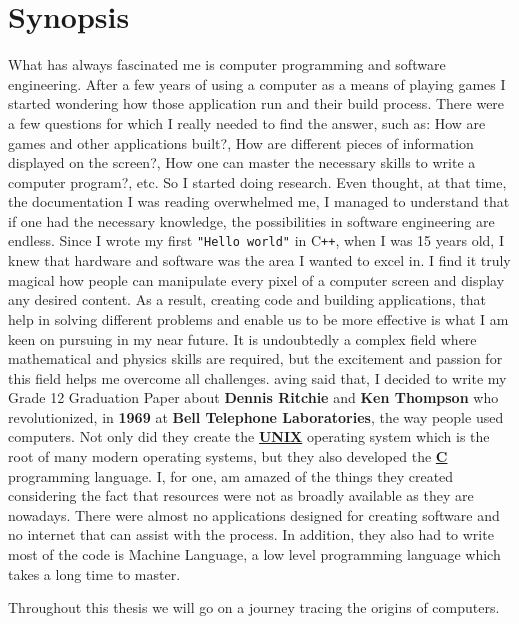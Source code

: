 \documentclass[12pt]{article}
\begin{document}
\section{Synopsis}
What has always fascinated me is computer programming and software engineering.
After a few years of using a computer as a means of playing games I started wondering how those application run and their build process.
There were a few questions for which I really needed to find the answer, such as: How are games and other applications built?, How are different pieces of information displayed on the screen?,
How one can master the necessary skills to write a computer program?, etc. So I started doing research. Even thought, at that time, the documentation I was reading overwhelmed me,
I managed to understand that if one had the necessary knowledge, the possibilities in software engineering are endless. Since I wrote my first \verb|"Hello world"| in C\texttt{++}, when I was 15 years old,
I knew that hardware and software was the area I wanted to excel in. I find it truly magical how people can manipulate every pixel of a computer screen and display any desired content.\newline\newline
As a result, creating code and building applications, that help in solving different problems and enable us to be more effective is what I am keen on pursuing in my near future.
It is undoubtedly a complex field where mathematical and physics skills are required, but the excitement and passion for this field helps me overcome all challenges. \newline\newline
aving said that, I decided to write my Grade 12 Graduation Paper about \textbf{Dennis Ritchie} and \textbf{Ken Thompson} who revolutionized, in \textbf{1969} at \textbf{Bell Telephone Laboratories},
the way people used computers. Not only did they create the \underline{\textbf{UNIX}} operating system which is the root of many modern operating systems, but they also developed the \underline{\textbf{C}}
programming language. I, for one, am amazed of the things they created considering the fact that resources were not as broadly available as they are nowadays.
There were almost no applications designed for creating software and no internet that can assist with the process. In addition, they also had to write most of the code is Machine Language,
a low level programming language which takes a long time to master.\newline
\begin{center}
    Throughout this thesis we will go on a journey tracing the origins of computers.\newline
\end{center}
\end{document}

